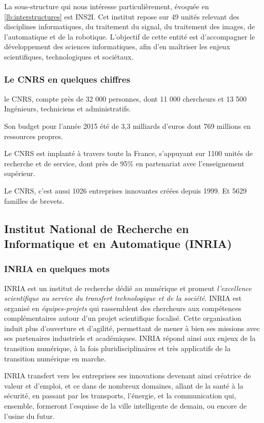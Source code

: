 \documentclass{tnreport}
\begin{document}
\vspace{0.5cm}
La sous-structure qui nous intéresse particulièrement, évoquée en \ref{lb:interstructures} est \gls{INS2I}. Cet institut repose sur 49 unités relevant des disciplines informatiques, du traitement du signal, du traitement des images, de l'automatique et de la robotique. L'objectif de cette entité est d'accompagner le développement des sciences informatiques, afin d'en maîtriser les enjeux scientifiques, technologiques et sociétaux.  

\subsubsection{Le CNRS en quelques chiffres}

le \gls{CNRS}, compte près de 32 000 personnes, dont 11 000 chercheurs et 13 500 Ingénieurs, techniciens et administratifs. 

Son budget pour l'année 2015 été de 3,3 milliards d'euros dont 769 millions en ressources propres. 

Le \gls{CNRS} est implanté à travers toute la France, s'appuyant sur 1100 unités de recherche et de service, dont près de 95\% en partenariat avec l'enseignement supérieur.

Le \gls{CNRS}, c'est aussi 1026 entreprises innovantes créées depuis 1999. Et 5629 familles de brevets. 

\clearpage
\subsection{Institut National de Recherche en Informatique et en Automatique (INRIA)}
\subsubsection{INRIA en quelques mots}
\gls{INRIA} est un institut de recherche dédié au numérique et promeut \textit{l'excellence scientifique au service du transfert technologique et de la société}. \gls{INRIA} est organisé en \textit{équipes-projets} qui rassemblent des chercheurs aux compétences complémentaires autour d’un projet scientifique focalisé. Cette organisation induit plus d'ouverture et d'agilité, permettant de mener à bien ses missions avec ses partenaires industriels et académiques. \gls{INRIA} répond ainsi aux enjeux de la transition numérique, à la fois pluridisciplinaires et très applicatifs de la transition numérique en marche. 

\gls{INRIA} transfert vers les entreprises ses innovations devenant ainsi créatrice de valeur et d'emploi, et ce dans de nombreux domaines, allant de la santé à la sécurité, en passant par les transports, l'énergie, et la communication qui, ensemble, formeront l'esquisse de la ville intelligente de demain, ou encore de l'usine du futur.
\end{document}
